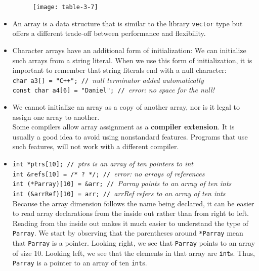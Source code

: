 \begin{itemize}
\begin{figure}[ht]
\texttt{[image: table-3-7]}
\centering
\end{figure}

\item
An array is a data structure that is similar to the library \texttt{vector} type but offers a different trade-off between performance and flexibility.

\item
Character arrays have an additional form of initialization: We can initialize such arrays from a string literal. When we use this form of initialization, it is important to remember that string literals end with a null character:\\
\hspace*{1em}\texttt{char a3[] = "C++"; // }\textit{null terminator added automatically}\\
\hspace*{1em}\texttt{const char a4[6] = "Daniel"; // }\textit{error: no space for the null!}

\item
We cannot initialize an array as a copy of another array, nor is it legal to assign one array to another.\\
Some compilers allow array assignment as a \textbf{compiler extension}. It is usually a good idea to avoid using nonstandard features. Programs that use such features, will not work with a different compiler.

\item
\hspace*{1em}\texttt{int *ptrs[10]; // }\textit{ptrs is an array of ten pointers to int}\\
\hspace*{1em}\texttt{int \&refs[10] = /* ? */; // }\textit{error: no arrays of references}\\
\hspace*{1em}\texttt{int (*Parray)[10] = \&arr; // }\textit{Parray points to an array of ten ints}\\
\hspace*{1em}\texttt{int (\&arrRef)[10] = arr; // }\textit{arrRef refers to an array of ten ints}\\
Because the array dimension follows the name being declared, it can be easier to read array declarations from the inside out rather than from right to left. Reading from the inside out makes it much easier to understand the type of \texttt{Parray}. We start by observing that the parentheses around \texttt{*Parray} mean that \texttt{Parray} is a pointer. Looking right, we see that \texttt{Parray} points to an array of size 10. Looking left, we see that the elements in that array are \texttt{int}s. Thus, \texttt{Parray} is a pointer to an array of ten \texttt{int}s.


\end{itemize}
